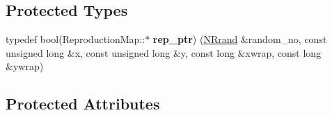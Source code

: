 \subsection*{Protected Types}
\begin{DoxyCompactItemize}
\item 
typedef bool(Reproduction\+Map\+::$\ast$ {\bfseries rep\+\_\+ptr}) (\hyperlink{class_n_rrand}{N\+Rrand} \&random\+\_\+no, const unsigned long \&x, const unsigned long \&y, const long \&xwrap, const long \&ywrap)\hypertarget{class_reproduction_map_a5edd07fa5fe2f2ecbd778f2fa20d2a88}{}\label{class_reproduction_map_a5edd07fa5fe2f2ecbd778f2fa20d2a88}

\end{DoxyCompactItemize}
\subsection*{Protected Attributes}
